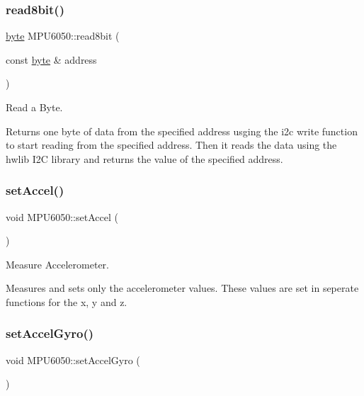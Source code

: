\subsubsection{\texorpdfstring{read8bit()}{read8bit()}}
{\footnotesize\ttfamily \mbox{\hyperlink{_m_p_u6050_8hpp_a71809484a26cd96c6abe839a0a8a289d}{byte}} M\+P\+U6050\+::read8bit (\begin{DoxyParamCaption}\item[{const \mbox{\hyperlink{_m_p_u6050_8hpp_a71809484a26cd96c6abe839a0a8a289d}{byte}} \&}]{address }\end{DoxyParamCaption})}



Read a Byte. 

Returns one byte of data from the specified address usging the i2c write function to start reading from the specified address. Then it reads the data using the hwlib I2C library and returns the value of the specified address. \mbox{\label{class_m_p_u6050_ab4b3c0b6ac0c3217bf72739ede81f31b}} 
\subsubsection{\texorpdfstring{set\+Accel()}{setAccel()}}
{\footnotesize\ttfamily void M\+P\+U6050\+::set\+Accel (\begin{DoxyParamCaption}{ }\end{DoxyParamCaption})}



Measure Accelerometer. 

Measures and sets only the accelerometer values. These values are set in seperate functions for the x, y and z. \mbox{\label{class_m_p_u6050_a25bc66e46d8f4ddfcd75b9e04c3d51b9}} 
\subsubsection{\texorpdfstring{set\+Accel\+Gyro()}{setAccelGyro()}}
{\footnotesize\ttfamily void M\+P\+U6050\+::set\+Accel\+Gyro (\begin{DoxyParamCaption}{ }\end{DoxyParamCaption})}



